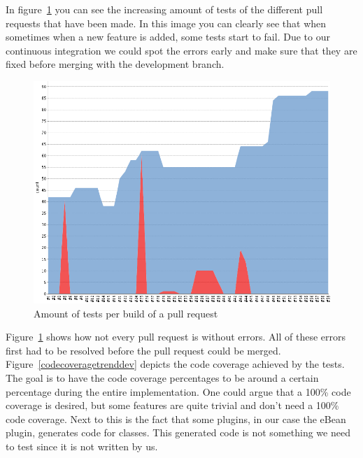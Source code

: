In figure~\ref{testresulttrendpullrequest} you can see the increasing amount of tests of the different pull requests that have been made.
In this image you can clearly see that when sometimes when a new feature is added, some tests start to fail.
Due to our continuous integration we could spot the errors early and make sure that they are fixed before merging with the development branch.

\begin{figure}[h]
    \centering
    \includegraphics[width=\textwidth]{images/TestresultTrendPullRequests}
    \caption{Amount of tests per build of a pull request}
    \label{testresulttrendpullrequest}
\end{figure}

Figure~\ref{testresulttrendpullrequest} shows how not every pull request is without errors.
All of these errors first had to be resolved before the pull request could be merged.\\

Figure~\ref{codecoveragetrenddev} depicts the code coverage achieved by the tests.
The goal is to have the code coverage percentages to be around a certain percentage during the entire implementation.
One could argue that a 100\% code coverage is desired, but some features are quite trivial and don't need a 100\% code coverage.
Next to this is the fact that some plugins, in our case the eBean plugin, generates code for classes.
This generated code is not something we need to test since it is not written by us.\\

